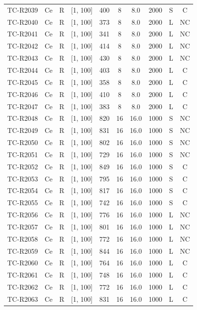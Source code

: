 \begin{longtable}{lccccccccc}
TC-R2039 & Ce & R & [1, 100] & 400 & 8 & 8.0 & 2000 & S & C \\
TC-R2040 & Ce & R & [1, 100] & 373 & 8 & 8.0 & 2000 & L & NC \\
TC-R2041 & Ce & R & [1, 100] & 341 & 8 & 8.0 & 2000 & L & NC \\
TC-R2042 & Ce & R & [1, 100] & 414 & 8 & 8.0 & 2000 & L & NC \\
TC-R2043 & Ce & R & [1, 100] & 430 & 8 & 8.0 & 2000 & L & NC \\
TC-R2044 & Ce & R & [1, 100] & 403 & 8 & 8.0 & 2000 & L & C \\
TC-R2045 & Ce & R & [1, 100] & 358 & 8 & 8.0 & 2000 & L & C \\
TC-R2046 & Ce & R & [1, 100] & 410 & 8 & 8.0 & 2000 & L & C \\
TC-R2047 & Ce & R & [1, 100] & 383 & 8 & 8.0 & 2000 & L & C \\
TC-R2048 & Ce & R & [1, 100] & 820 & 16 & 16.0 & 1000 & S & NC \\
TC-R2049 & Ce & R & [1, 100] & 831 & 16 & 16.0 & 1000 & S & NC \\
TC-R2050 & Ce & R & [1, 100] & 802 & 16 & 16.0 & 1000 & S & NC \\
TC-R2051 & Ce & R & [1, 100] & 729 & 16 & 16.0 & 1000 & S & NC \\
TC-R2052 & Ce & R & [1, 100] & 849 & 16 & 16.0 & 1000 & S & C \\
TC-R2053 & Ce & R & [1, 100] & 795 & 16 & 16.0 & 1000 & S & C \\
TC-R2054 & Ce & R & [1, 100] & 817 & 16 & 16.0 & 1000 & S & C \\
TC-R2055 & Ce & R & [1, 100] & 742 & 16 & 16.0 & 1000 & S & C \\
TC-R2056 & Ce & R & [1, 100] & 776 & 16 & 16.0 & 1000 & L & NC \\
TC-R2057 & Ce & R & [1, 100] & 801 & 16 & 16.0 & 1000 & L & NC \\
TC-R2058 & Ce & R & [1, 100] & 772 & 16 & 16.0 & 1000 & L & NC \\
TC-R2059 & Ce & R & [1, 100] & 844 & 16 & 16.0 & 1000 & L & NC \\
TC-R2060 & Ce & R & [1, 100] & 764 & 16 & 16.0 & 1000 & L & C \\
TC-R2061 & Ce & R & [1, 100] & 748 & 16 & 16.0 & 1000 & L & C \\
TC-R2062 & Ce & R & [1, 100] & 772 & 16 & 16.0 & 1000 & L & C \\
TC-R2063 & Ce & R & [1, 100] & 831 & 16 & 16.0 & 1000 & L & C \\

\end{longtable}
